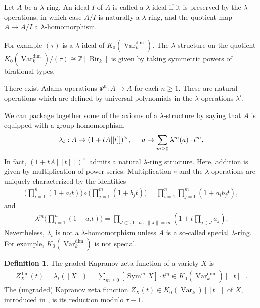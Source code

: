 \documentclass{amsart}
\theoremstyle{definition}
\newtheorem{defn}[thm]{Definition}
\DeclareMathOperator{\Sym}{Sym}
\DeclareMathOperator{\Bir}{Bir}
\DeclareMathOperator{\Var}{Var}
\newcommand{\Kdim}{K_0(\Var_k^{\dim})}
\numberwithin{equation}{section}
\begin{document}
Let $A$ be a $\lambda$-ring. An ideal $I$ of $A$ is called a $\lambda$-ideal if it is preserved by the $\lambda$-operations, in which case $A/I$ is naturally a $\lambda$-ring, and the quotient map $A \rightarrow A/I$ a $\lambda$-homomorphism. 

For example $(\tau)$ is a $\lambda$-ideal of $\Kdim$. The $\lambda$-structure on the quotient $\Kdim / (\tau) \cong \mathbb{Z}[\Bir_k]$ is given by taking symmetric powers of birational types.

There exist Adams operations $\Psi^n: A \rightarrow A$ for each $n \geq 1$. These are natural operations which are defined by universal polynomials in the $\lambda$-operations $\lambda^i$.


We can package together some of the axioms of a $\lambda$-structure by saying that $A$ is equipped with a group homomorphism
\begin{align*}
    \lambda_t: A \rightarrow (1+t A[[t]])^\times, \hspace{.5cm} a \mapsto \sum_{m \geq 0} \lambda^m(a) \cdot t^m.
\end{align*}
In fact, $(1+tA[[t]])^\times$ admits a natural $\lambda$-ring structure. Here, addition is given by multiplication of power series. Multiplication $\circ$ and the $\lambda$-operations are uniquely characterized by the identities
\begin{align*}
    \bigg( \prod_{i=1}^n (1+a_i t) \bigg) \circ \bigg( \prod_{j=1}^m (1+b_j t) \bigg) = \prod_{i=1}^n \prod_{j=1}^m (1+a_i b_j t ),
\end{align*}
and
\begin{align*}
    \lambda^m \bigg( \prod_{i=1}^n (1+a_i t) \bigg) = \prod_{J \subset \{1 \ldots n\}, \| J\|=m} (1+t \prod_{j \in J}a_j).
\end{align*}
Nevertheless, $\lambda_t$ is not a $\lambda$-homomorphism unless $A$ is a so-called special $\lambda$-ring. For example, $\Kdim$ is not special.


\begin{defn}
The graded Kapranov zeta function of a variety $X$ is 
\begin{align*}
    Z_X^{\dim}(t) = \lambda_t([X]) = \sum_{m \geq 0}[\Sym^m X] \cdot t^m \in \Kdim[[t]].
\end{align*}
The (ungraded) Kapranov zeta function $Z_X(t) \in K_0(\Var_k)[[t]]$ of $X$, introduced in \cite{kapranov}, is its reduction modulo $\tau-1$.
\end{defn}
\end{document}
